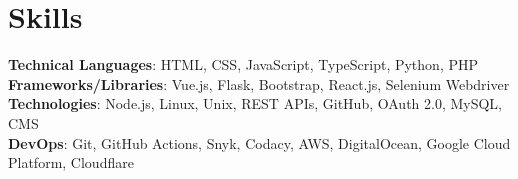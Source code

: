 \section{Skills}
 \begin{itemize}[leftmargin=0.15in, label={}]
    \small{\item{
     \textbf{Technical Languages}{: HTML, CSS, JavaScript, TypeScript, Python, PHP} \\
     \textbf{Frameworks/Libraries}{: Vue.js, Flask, Bootstrap, React.js, Selenium Webdriver} \\
     \textbf{Technologies}{: Node.js, Linux, Unix, REST APIs, GitHub, OAuth 2.0, MySQL, CMS } \\
     \textbf{DevOps}{: Git, GitHub Actions, Snyk, Codacy, AWS, DigitalOcean, Google Cloud Platform, Cloudflare }
    }}
 \end{itemize}  
